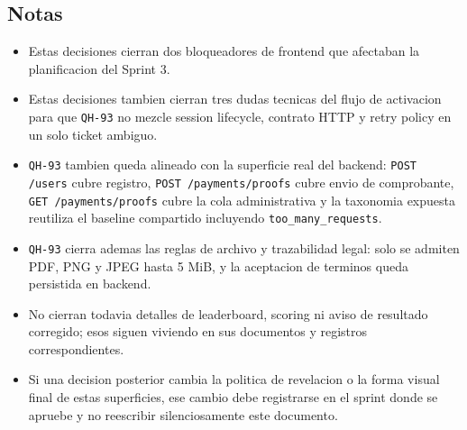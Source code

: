 \subsection{Notas}

\begin{itemize}
  \item Estas decisiones cierran dos bloqueadores de frontend que afectaban la planificacion del Sprint 3.
  \item Estas decisiones tambien cierran tres dudas tecnicas del flujo de activacion para que \texttt{QH-93} no mezcle session lifecycle, contrato HTTP y retry policy en un solo ticket ambiguo.
  \item \texttt{QH-93} tambien queda alineado con la superficie real del backend: \texttt{POST /users} cubre registro, \texttt{POST /payments/proofs} cubre envio de comprobante, \texttt{GET /payments/proofs} cubre la cola administrativa y la taxonomia expuesta reutiliza el baseline compartido incluyendo \texttt{too\_many\_requests}.
  \item \texttt{QH-93} cierra ademas las reglas de archivo y trazabilidad legal: solo se admiten PDF, PNG y JPEG hasta 5 MiB, y la aceptacion de terminos queda persistida en backend.
  \item No cierran todavia detalles de leaderboard, scoring ni aviso de resultado corregido; esos siguen viviendo en sus documentos y registros correspondientes.
  \item Si una decision posterior cambia la politica de revelacion o la forma visual final de estas superficies, ese cambio debe registrarse en el sprint donde se apruebe y no reescribir silenciosamente este documento.
\end{itemize}
